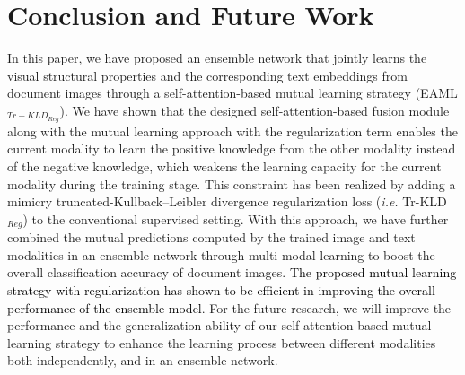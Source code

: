 \documentclass[twocolumn]{svjour3}
\newcommand{\ie}{\textit{i.e. }}
\begin{document}
\section{Conclusion and Future Work}
\label{sec:Conclusion and Future Work}

In this paper, we have proposed an ensemble network that jointly learns the visual structural properties and the corresponding text embeddings from document images through a self-attention-based mutual learning strategy (EAML$_{{Tr-KLD}_{Reg}}$). We have shown that the designed self-attention-based fusion module along with the mutual learning approach with the regularization term enables the current modality to learn the positive knowledge from the other modality instead of the negative knowledge, which weakens the learning capacity for the current modality during the training stage. This constraint has been realized by adding a mimicry truncated-Kullback–Leibler divergence regularization loss (\ie Tr-KLD$_{Reg}$) to the conventional supervised setting. With this approach, we have further combined the mutual predictions computed by the trained image and text modalities in an ensemble network through multi-modal learning to boost the overall classification accuracy of document images. \textcolor{black}{The proposed mutual learning strategy with regularization has shown to be efficient in improving the overall performance of the ensemble model}. For the future research, we will improve the performance and the generalization ability of our self-attention-based mutual learning strategy to enhance the learning process between different modalities both independently, and in an ensemble network.









      


\end{document}
